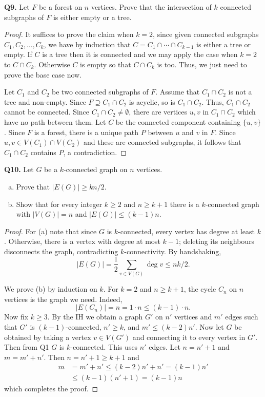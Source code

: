\noindent \textbf{Q9.} Let \( F \) be a forest on \( n \) vertices. Prove that the intersection of \( k \) connected subgraphs of \( F \) is either empty or a tree.
\begin{proof}
It suffices to prove the claim when \( k = 2 \), since given connected subgraphs \( C_1, C_2, \hdots , C_{k}  \), we have by induction that \(C = C_1 \cap \cdots \cap C_{k-1}  \) is either a tree or empty. If \( C \) is a tree then it is connected and we may apply the case when \( k = 2 \) to \( C \cap C_{k}  \). Otherwise \( C \) is empty so that \( C \cap C_{k}  \) is too. Thus, we just need to prove the base case now.

Let \( C_1 \) and \( C_2 \) be two connected subgraphs of \( F \). Assume that \( C_1 \cap C_2 \) is not a tree and non-empty. Since \( F \supseteq C_1 \cap C_2 \) is acyclic, so is \( C_1 \cap C_2 \). Thus, \( C_1 \cap C_2 \) cannot be connected. Since \( C_1 \cap C_2 \neq \emptyset  \), there are vertices \( u,v \) in \( C_1 \cap C_2 \) which have no path between them. Let \( C \) be the connected component containing \( \{ u,v \}  \). Since \( F \) is a forest, there is a unique path \( P \) between \( u \) and \( v \) in \( F \). Since \( u,v \in V(C_1) \cap V(C_2)\) and these are connected subgraphs, it follows that \( C_1 \cap C_2 \) contains \( P \), a contradiction.
\end{proof}
\noindent \textbf{Q10.} Let \( G \) be a \( k \)-connected graph on \( n \) vertices. 
\begin{enumerate}[(a)]
	\item Prove that \( |E(G)| \geq kn/2 \).
	\item Show that for every integer \( k \geq 2 \) and \( n \geq k + 1 \) there is a \( k \)-connected graph with \( |V(G)| = n \) and \( |E(G)| \leq (k-1)n \).
\end{enumerate}
\begin{proof}
	For (a) note that since \( G \) is \( k \)-connected, every vertex has degree at least \( k \). Otherwise, there is a vertex with degree at most \( k - 1 \); deleting its neighbours disconnects the graph, contradicting \( k \)-connectivity. By handshaking, \[|E(G)| = \frac{1}{2}  \sum_{v \in V(G)}^{} \deg v \leq nk/2.  \] 

We prove (b) by induction on \( k \). For \( k = 2 \) and \( n \geq k + 1 \), the cycle \( C_{n}  \) on \( n \) vertices is the graph we need. Indeed, \[ |E(C_{n})| = n = 1 \cdot n \leq (k-1)\cdot n. \] Now fix \( k\geq 3 \). By the IH we obtain a graph \( G' \) on \( n' \) vertices and \( m' \) edges such that \( G' \) is \( (k-1) \)-connected, \( n' \geq k \), and \( m' \leq (k - 2)n' \). Now let \( G \) be obtained by taking a vertex \( v \in V(G') \) and connecting it to every vertex in \( G' \). Then from Q1 \( G \) is \( k \)-connected. This uses \( n' \) edges. Let \( n = n' + 1 \) and \( m = m' + n' \). Then \( n = n' + 1 \geq k + 1 \) and
	\begin{align*}
		m &= m' + n' \leq (k-2)n' + n' = (k-1)n' \\ 
		  &\leq (k-1)(n' + 1) = (k-1)n
	\end{align*}
which completes the proof.
\end{proof}
